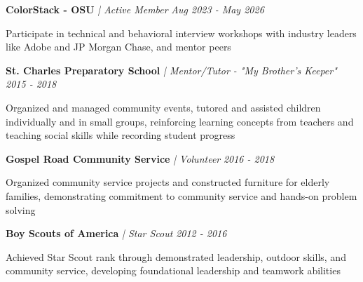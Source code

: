 \documentclass[letterpaper]{article}
\begin{document}
    \textbf{ColorStack - OSU} \textit{| Active Member} \hfill \textsl{Aug 2023 - May 2026}\\
    \vspace{-2mm}
    \begin{tightitemize} \itemsep -1mm
    
        \item Participate in technical and behavioral interview workshops with industry leaders like Adobe and JP Morgan Chase, and mentor peers
        
    \end{tightitemize}
    \vspace{-1mm}

    \textbf{St. Charles Preparatory School} \textit{| Mentor/Tutor - "My Brother's Keeper"} \hfill \textsl{2015 - 2018}\\
    \vspace{-2mm}
    \begin{tightitemize} \itemsep -1mm
    
        \item Organized and managed community events, tutored and assisted children individually and in small groups, reinforcing learning concepts from teachers and teaching social skills while recording student progress
        
    \end{tightitemize}
    \vspace{-1mm}

    \textbf{Gospel Road Community Service} \textit{| Volunteer} \hfill \textsl{2016 - 2018}\\
    \vspace{-2mm}
    \begin{tightitemize} \itemsep -1mm
    
        \item Organized community service projects and constructed furniture for elderly families, demonstrating commitment to community service and hands-on problem solving
        
    \end{tightitemize}
    \vspace{-1mm}

    \textbf{Boy Scouts of America} \textit{| Star Scout} \hfill \textsl{2012 - 2016}\\
    \vspace{-2mm}
    \begin{tightitemize} \itemsep -1mm
    
        \item Achieved Star Scout rank through demonstrated leadership, outdoor skills, and community service, developing foundational leadership and teamwork abilities
        
    \end{tightitemize}
    \vspace{-1mm}
\end{document}
